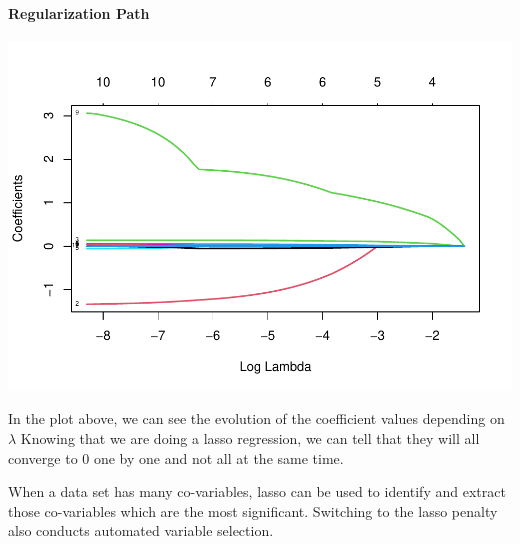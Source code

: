 \documentclass[
]{article}
\newenvironment{Shaded}{\begin{snugshade}}{\end{snugshade}}
\newcommand{\AttributeTok}[1]{\textcolor[rgb]{0.77,0.63,0.00}{#1}}
\newcommand{\ConstantTok}[1]{\textcolor[rgb]{0.00,0.00,0.00}{#1}}
\newcommand{\DecValTok}[1]{\textcolor[rgb]{0.00,0.00,0.81}{#1}}
\newcommand{\FunctionTok}[1]{\textcolor[rgb]{0.00,0.00,0.00}{#1}}
\newcommand{\NormalTok}[1]{#1}
\newcommand{\OtherTok}[1]{\textcolor[rgb]{0.56,0.35,0.01}{#1}}
\newcommand{\SpecialCharTok}[1]{\textcolor[rgb]{0.00,0.00,0.00}{#1}}
\newcommand{\StringTok}[1]{\textcolor[rgb]{0.31,0.60,0.02}{#1}}
\begin{document}
\hypertarget{regularization-path-1}{%
\paragraph{Regularization Path}\label{regularization-path-1}}

\begin{Shaded}
\end{Shaded}

\begin{center}\includegraphics{TP3_MERR_HABBOU_KHIDOUR_files/figure-latex/unnamed-chunk-47-1} \end{center}

In the plot above, we can see the evolution of the coefficient values
depending on \(\lambda\) Knowing that we are doing a lasso regression,
we can tell that they will all converge to 0 one by one and not all at
the same time.

When a data set has many co-variables, lasso can be used to identify and
extract those co-variables which are the most significant. Switching to
the lasso penalty also conducts automated variable selection.
\end{document}
